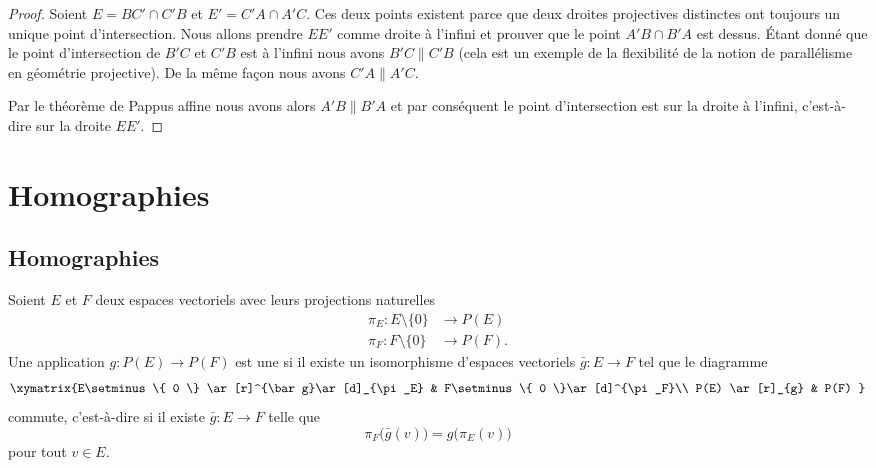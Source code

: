\begin{proof}
	Soient \( E=BC'\cap C'B\) et \( E'=C'A\cap A'C\). Ces deux points existent parce que deux droites projectives distinctes ont toujours un unique point d'intersection. Nous allons prendre \( EE'\) comme droite à l'infini et prouver que le point \( A'B\cap B'A\) est dessus. Étant donné que le point d'intersection de \( B'C\) et \( C'B\) est à l'infini nous avons \( B'C\parallel C'B\) (cela est un exemple de la flexibilité de la notion de parallélisme en géométrie projective). De la même façon nous avons \( C'A\parallel A'C\).

	Par le théorème de Pappus affine nous avons alors \( A'B\parallel B'A\) et par conséquent le point d'intersection est sur la droite à l'infini, c'est-à-dire sur la droite \( EE'\).
\end{proof}

\section{Homographies}

\subsection{Homographies}

\begin{definition}      \label{DEFooKWSMooXvOeEP}
	Soient \( E\) et \( F\) deux espaces vectoriels avec leurs projections naturelles
	\begin{subequations}
		\begin{align}
			\pi_E\colon E\setminus\{ 0 \} & \to P(E)  \\
			\pi_F\colon F\setminus\{ 0 \} & \to P(F).
		\end{align}
	\end{subequations}
	Une application \( g\colon P(E)\to P(F)\) est une  si il existe un isomorphisme d'espaces vectoriels \( \bar g\colon E\to F\) tel que le diagramme
	\begin{equation}
		\xymatrix{%
			E\setminus\{ 0 \} \ar[r]^{\bar g}\ar[d]_{\pi_E}        &   F\setminus\{ 0 \}\ar[d]^{\pi_F}\\
			P(E) \ar[r]_{g}   &   P(F)
		}
	\end{equation}
	commute, c'est-à-dire si il existe \( \bar g\colon E\to F\) telle que
	\begin{equation}        \label{EQooSEFWooRpjLxt}
		\pi_F\big( \bar g(v) \big)=g\big( \pi_E(v) \big)
	\end{equation}
	pour tout \( v\in E\).
\end{definition}

